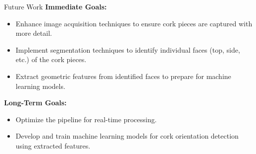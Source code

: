 \documentclass[10pt]{beamer}
\begin{document}
\begin{frame}{Future Work}
	\textbf{Immediate Goals:}
	\begin{itemize}
		\item Enhance image acquisition techniques to ensure cork pieces are captured with more detail.
		\item Implement segmentation techniques to identify individual faces (top, side, etc.) of the cork pieces.
		\item Extract geometric features from identified faces to prepare for machine learning models.
	\end{itemize}
	\textbf{Long-Term Goals:}
	\begin{itemize}
		\item Optimize the pipeline for real-time processing.
		\item Develop and train machine learning models for cork orientation detection using extracted features.
	\end{itemize}
\end{frame}

	
\end{document}
